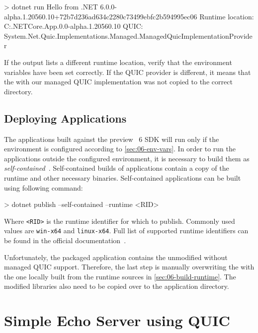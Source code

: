 \begin{myVerbatim}
> dotnet run
Hello from .NET 6.0.0-alpha.1.20560.10+72b7d236ad634c2280c73499ebfc2b594995ec06
Runtime location: C:\dotnet\shared\Microsoft.NETCore.App\6.0.0-alpha.1.20560.10
QUIC: System.Net.Quic.Implementations.Managed.ManagedQuicImplementationProvider
\end{myVerbatim}

If the output lists a different runtime location, verify that the environment variables have been
set correctly. If the QUIC provider is different, it means that the \SystemNetQuicDll{} with our
managed QUIC implementation was not copied to the correct directory.

\subsection{Deploying \dotnet{} Applications}

The applications built against the preview \dotnet{}~6 SDK will run only if the environment is
configured according to \autoref{sec:06-env-vars}. In order to run the applications outside the
configured environment, it is necessary to build them as
\textit{self-contained}~\cite{SelfContainedPublishDocs}. Self-contained builds of \dotnet{}
applications contain a copy of the \dotnet{} runtime and other necessary binaries. Self-contained
applications can be built using following command:

\begin{myVerbatim}
> dotnet publish --self-contained --runtime <RID>
\end{myVerbatim}

Where \texttt{<RID>} is the runtime identifier for which to publish. Commonly used values are
\texttt{win-x64} and \texttt{linux-x64}. Full list of supported runtime identifiers can be found in
the official \dotnet{} documentation~\cite{dotnetRIDs}.

Unfortunately, the packaged application contains the unmodified \SystemNetQuicDll{} without managed
QUIC support. Therefore, the last step is manually overwriting the \SystemNetQuicDll{} with the one
locally built from the \dotnet{} runtime sources in \autoref{sec:06-build-runtime}. The modified
\libopenssl{} libraries also need to be copied over to the application directory.

\section{Simple Echo Server using QUIC}\label{sec:06tutorial}

